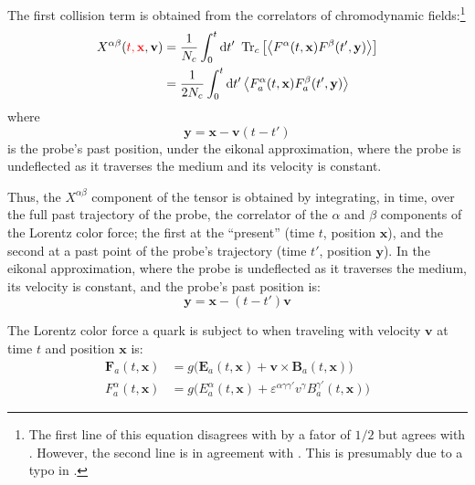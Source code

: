 The first collision term is obtained from the correlators of chromodynamic fields:\footnote{The first line of this equation disagrees with \cite{Carrington_2022} by a fator of $1/2$ but agrees with \cite{Mrowczynski2018}. However, the second line is in agreement with \cite{Carrington_2022}. This is presumably due to a typo in \cite{Carrington_2022}.}
\begin{equation}
\begin{split}
	X^{\alpha \beta} (\textcolor{red}{t,\mathbf{x}}, \mathbf{v}) & = \frac{1}{N_c} \int_0^t \mathop{}\!\mathrm{d} t' ~\operatorname{Tr}_c \left[ \left< F^\alpha(t, \mathbf{x} ) F^\beta(t', \mathbf{y} )\right> \right] \\
	& = \frac{1}{2 N_c} \int_0^t \mathop{}\!\mathrm{d} t' \left< F^\alpha_a(t, \mathbf{x} ) F^\beta_a(t', \mathbf{y} )\right>
	\end{split}
\label{eq:short_X}
\end{equation}
\noindent where 
\begin{equation}
\mathbf{y} = \mathbf{x} - \mathbf{v} (t - t')
\end{equation}
is the probe's past position, under the eikonal approximation, where the probe is undeflected as it traverses the medium and its velocity is constant.

Thus, the $X^{\alpha \beta}$ component of the tensor is obtained by integrating, in time, over the full past trajectory of the probe, the correlator of the $\alpha$ and $\beta$ components of the Lorentz color force; the first at the ``present'' (time $t$, position $\mathbf{x}$), and the second at a past point of the probe's trajectory (time $t'$, position $\mathbf{y}$). In the eikonal approximation, where the probe is undeflected as it traverses the medium, its velocity is constant, and the probe's past position is:
\begin{equation}
	\mathbf{y} = \mathbf{x} - (t-t')\mathbf{v}
	\label{eq:past_position}
\end{equation}

The Lorentz color force a quark is subject to when traveling with velocity $\mathbf{v}$ at time $t$ and position $\mathbf{x}$ is:
\begin{subequations}
\begin{align}
\mathbf{F}_a(t, \mathbf{x}) & = g \big( \mathbf{E}_a(t, \mathbf{x}) + \mathbf{v} \times \mathbf{B}_a(t, \mathbf{x}) \big) \\
F^\alpha_a(t, \mathbf{x}) & = g \big( E^\alpha_a(t, \mathbf{x}) + \varepsilon^{\alpha \gamma \gamma'}{}v^{\gamma} B^{\gamma'}_a(t, \mathbf{x}) \big)
\label{eq:lorentz_force_component}
\end{align}
\end{subequations}

